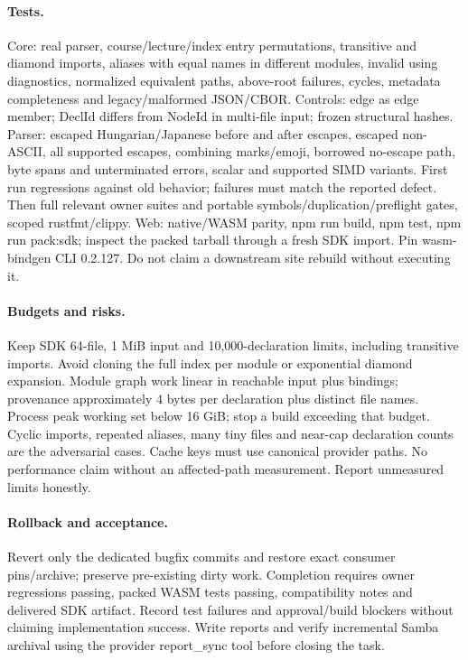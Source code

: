 \documentclass[11pt,a4paper]{article}
\begin{document}
\paragraph{Tests.} Core: real parser, course/lecture/index entry permutations,
transitive and diamond imports, aliases with equal names in different modules,
invalid using diagnostics, normalized equivalent paths, above-root failures,
cycles, metadata completeness and legacy/malformed JSON/CBOR. Controls: edge as
edge member; DeclId differs from NodeId in multi-file input; frozen structural
hashes. Parser: escaped Hungarian/Japanese before and after escapes, escaped
non-ASCII, all supported escapes, combining marks/emoji, borrowed no-escape path,
byte spans and unterminated errors, scalar and supported SIMD variants. First run
regressions against old behavior; failures must match the reported defect. Then
full relevant owner suites and portable symbols/duplication/preflight gates,
scoped rustfmt/clippy. Web: native/WASM parity, npm run build, npm test,
npm run pack:sdk; inspect the packed tarball through a fresh SDK import. Pin
wasm-bindgen CLI 0.2.127. Do not claim a downstream site rebuild without executing it.
\paragraph{Budgets and risks.} Keep SDK 64-file, 1 MiB input and 10,000-declaration
limits, including transitive imports. Avoid cloning the full index per module or
exponential diamond expansion. Module graph work linear in reachable input plus
bindings; provenance approximately 4 bytes per declaration plus distinct file names.
Process peak working set below 16 GiB; stop a build exceeding that budget. Cyclic
imports, repeated aliases, many tiny files and near-cap declaration counts are the
adversarial cases. Cache keys must use canonical provider paths. No performance
claim without an affected-path measurement. Report unmeasured limits honestly.
\paragraph{Rollback and acceptance.} Revert only the dedicated bugfix commits and
restore exact consumer pins/archive; preserve pre-existing dirty work. Completion
requires owner regressions passing, packed WASM tests passing, compatibility notes
and delivered SDK artifact. Record test failures and approval/build blockers without
claiming implementation success. Write reports and verify incremental Samba archival
using the provider report\_sync tool before closing the task.
\begin{center}\end{center}
\end{document}
